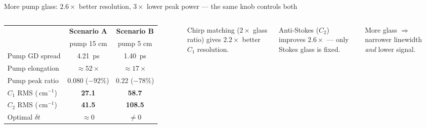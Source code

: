 \documentclass[aspectratio=169, 11pt]{beamer}
\newcommand{\wn}{\,\text{cm}^{-1}}
\begin{document}
\begin{frame}{More pump glass: $2.6\times$ better resolution, $3\times$ lower peak power — the same knob controls both}
  \begin{columns}[T]
      \vspace{0.2em}
      \renewcommand{\arraystretch}{1.25}
      \begin{table}
        \centering\small
        \begin{tabular}{lcc}
          \toprule
          & \textbf{Scenario A} & \textbf{Scenario B} \\
          & \footnotesize pump 15 cm & \footnotesize pump 5 cm \\
          \midrule
          Pump GD spread     & \SI{4.21}{ps}           & \SI{1.40}{ps} \\
          Pump elongation    & $\approx 52\times$      & $\approx 17\times$ \\
          Pump peak ratio    & 0.080 \;($-92\%$)       & 0.22\phantom{0} \;($-78\%$) \\
          \midrule
          $C_1$ RMS ($\wn$)  & \textbf{27.1}           & \textbf{58.7} \\
          $C_2$ RMS ($\wn$)  & \textbf{41.5}           & \textbf{108.5} \\
          Optimal $\delta t$ & $\approx 0$             & $\neq 0$ \\
          \bottomrule
        \end{tabular}
      \end{table}

      \vspace{0.8em}
      \alert{Chirp matching ($2\times$ glass ratio) gives $2.2\times$ better $C_1$ resolution.}

      \vspace{0.6em}
      \alert{Anti-Stokes ($C_2$) improves $2.6\times$ — only Stokes glass is fixed.}

      \vspace{0.6em}
      \alert{More glass $\Rightarrow$ narrower linewidth \emph{and} lower signal.}
  \end{columns}
\end{frame}
\end{document}
